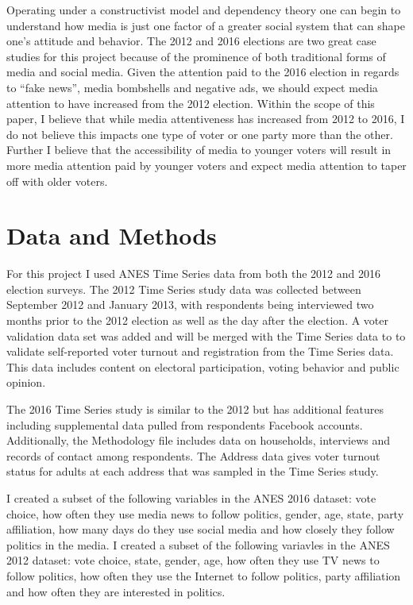 \documentclass[11pt,]{article}
\begin{document}
Operating under a constructivist model and dependency theory one can
begin to understand how media is just one factor of a greater social
system that can shape one's attitude and behavior. The 2012 and 2016
elections are two great case studies for this project because of the
prominence of both traditional forms of media and social media. Given
the attention paid to the 2016 election in regards to ``fake news'',
media bombshells and negative ads, we should expect media attention to
have increased from the 2012 election. Within the scope of this paper, I
believe that while media attentiveness has increased from 2012 to 2016,
I do not believe this impacts one type of voter or one party more than
the other. Further I believe that the accessibility of media to younger
voters will result in more media attention paid by younger voters and
expect media attention to taper off with older voters.

\section{Data and Methods}\label{data-and-methods}

For this project I used ANES Time Series data from both the 2012 and
2016 election surveys. The 2012 Time Series study data was collected
between September 2012 and January 2013, with respondents being
interviewed two months prior to the 2012 election as well as the day
after the election. A voter validation data set was added and will be
merged with the Time Series data to to validate self-reported voter
turnout and registration from the Time Series data. This data includes
content on electoral participation, voting behavior and public opinion.

The 2016 Time Series study is similar to the 2012 but has additional
features including supplemental data pulled from respondents Facebook
accounts. Additionally, the Methodology file includes data on
households, interviews and records of contact among respondents. The
Address data gives voter turnout status for adults at each address that
was sampled in the Time Series study.

I created a subset of the following variables in the ANES 2016 dataset:
vote choice, how often they use media news to follow politics, gender,
age, state, party affiliation, how many days do they use social media
and how closely they follow politics in the media. I created a subset of
the following variavles in the ANES 2012 dataset: vote choice, state,
gender, age, how often they use TV news to follow politics, how often
they use the Internet to follow politics, party affiliation and how
often they are interested in politics.
\end{document}
